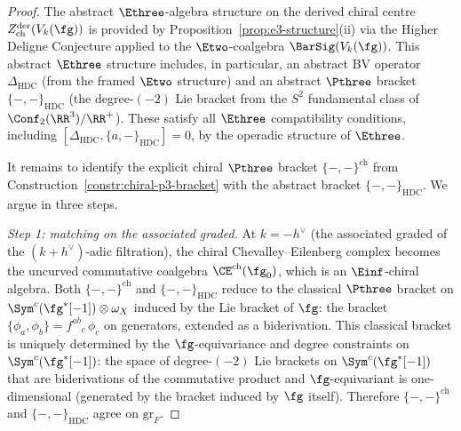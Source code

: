 \begin{proof}
The abstract $\Ethree$-algebra structure on the derived
chiral centre $Z^{\mathrm{der}}_{\mathrm{ch}}(V_k(\fg))$
is provided by Proposition~\ref{prop:e3-structure}(ii)
via the Higher Deligne Conjecture applied to the
$\Etwo$-coalgebra $\BarSig(V_k(\fg))$.
This abstract $\Ethree$ structure includes, in particular,
an abstract BV operator $\Delta_{\mathrm{HDC}}$
(from the framed $\Etwo$ structure) and an abstract
$\Pthree$ bracket $\{-,-\}_{\mathrm{HDC}}$
(the degree-$(-2)$ Lie bracket from the $S^2$ fundamental
class of $\Conf_2(\RR^3)/\RR^+$). These satisfy all
$\Ethree$ compatibility conditions, including
$[\Delta_{\mathrm{HDC}}, \{a, -\}_{\mathrm{HDC}}] = 0$,
by the operadic structure of $\Ethree$.

It remains to identify the explicit chiral $\Pthree$
bracket $\{-,-\}^{\mathrm{ch}}$ from
Construction~\ref{constr:chiral-p3-bracket} with
the abstract bracket $\{-,-\}_{\mathrm{HDC}}$. We argue
in three steps.

\textit{Step 1: matching on the associated graded.}
At $k = -h^\vee$ (the associated graded of the
$(k+h^\vee)$-adic filtration), the chiral
Chevalley--Eilenberg complex becomes the uncurved
commutative coalgebra $\CE^{\mathrm{ch}}(\fg_0)$,
which is an $\Einf$-chiral algebra.
Both $\{-,-\}^{\mathrm{ch}}$ and $\{-,-\}_{\mathrm{HDC}}$
reduce to the classical $\Pthree$ bracket on
$\Sym^c(\fg^*[-1]) \otimes \omega_X$ induced by the Lie
bracket of $\fg$: the bracket
$\{\phi_a, \phi_b\} = f^{ab}{}_c\,\phi_c$ on generators,
extended as a biderivation.
This classical bracket is uniquely determined by the
$\fg$-equivariance and degree constraints on
$\Sym^c(\fg^*[-1])$: the space of degree-$(-2)$
Lie brackets on $\Sym^c(\fg^*[-1])$ that are
biderivations of the commutative product and
$\fg$-equivariant is one-dimensional (generated by the
bracket induced by $\fg$ itself). Therefore
$\{-,-\}^{\mathrm{ch}}$ and $\{-,-\}_{\mathrm{HDC}}$
agree on $\mathrm{gr}_F$.


\end{proof}
